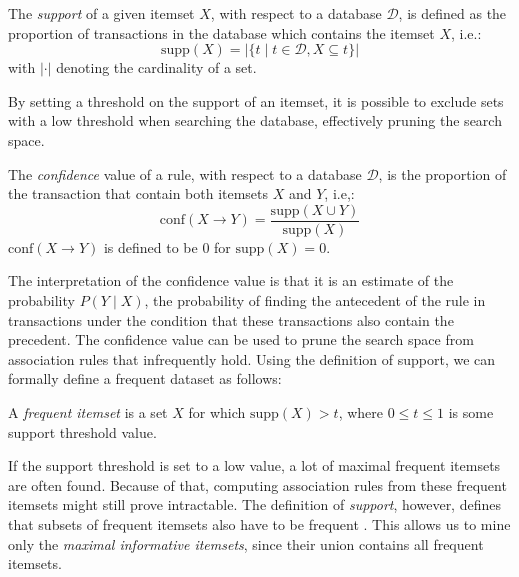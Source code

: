 \begin{definition}[Support]
	The \emph{support} of a given itemset $X$, with respect to a database $\mathcal{D}$, is defined as the proportion of transactions in the database which contains the itemset $X$, i.e.:
	\begin{equation*}
		\mathrm{supp}(X)=|\{t \mid t\in\mathcal{D}, X \subseteq t\}|
	\end{equation*}
	\noindent with $|\cdot|$ denoting the cardinality of a set.
\end{definition}

By setting a threshold on the support of an itemset, it is possible to exclude sets with a low threshold when searching the database, effectively pruning the search space.

\begin{definition}[Confidence]
	The \emph{confidence} value of a rule, with respect to a database $\mathcal{D}$, is the proportion of the transaction that contain both itemsets $X$ and $Y$, i.e,:
	\begin{equation*}
		\mathrm{conf}(X \rightarrow Y)=\frac{\mathrm{supp}(X \cup Y)}{\mathrm{supp}(X)}
	\end{equation*}
	\noindent $\mathrm{conf}(X \rightarrow Y)$ is defined to be $0$ for $\mathrm{supp}(X)=0$.
\end{definition}

The interpretation of the confidence value is that it is an estimate of the probability $P(Y \mid X)$, the probability of finding the antecedent of the rule in transactions under the condition that these transactions also contain the precedent.
The confidence value can be used to prune the search space from association rules that infrequently hold.
Using the definition of support, we can formally define a frequent dataset as follows:

\begin{definition}
	A \emph{frequent itemset} is a set $X$ for which $\mathrm{supp}(X)>t$, where $0 \leq t \leq 1$ is some support threshold value.
\end{definition}

If the support threshold is set to a low value, a lot of maximal frequent itemsets are often found.
Because of that, computing association rules from these frequent itemsets might still prove intractable.
The definition of \emph{support}, however, defines that subsets of frequent itemsets also have to be frequent \citep{Hahsler2007}.
This allows us to mine only the \emph{maximal informative itemsets}, since their union contains all frequent itemsets.

